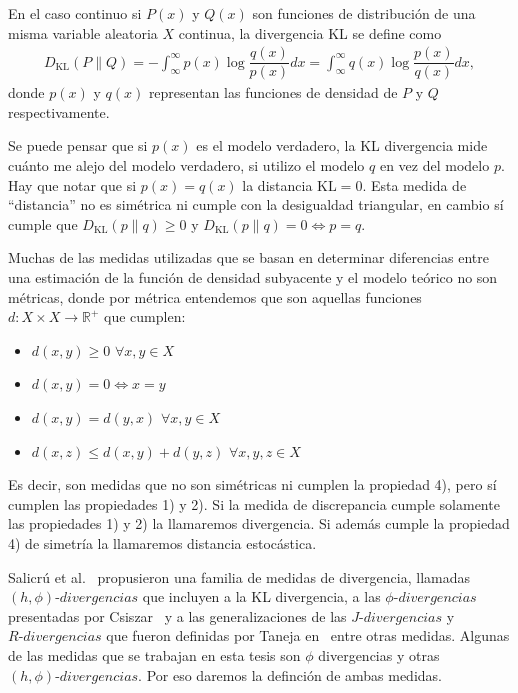 En el caso continuo si $P(x)$ y $Q(x)$ son funciones de distribuci\'on de una misma variable aleatoria $X$ continua, la divergencia KL se define como 
\begin{align}
\label{KL}
D_{\text{KL}}(P \rVert Q)=-\int_{\infty}^{\infty} p(x) \log\dfrac{q(x)}{p(x)} dx=\int_{\infty}^{\infty} q(x) \log\dfrac{p(x)}{q(x)} dx,
\end{align} 
donde $p(x)$ y $q(x)$ representan las funciones de densidad de $P$ y $Q$ respectivamente. 

Se puede pensar que si $p(x)$ es el modelo verdadero, la KL divergencia mide cu\'anto me alejo del modelo verdadero, si utilizo el modelo $q$ en vez del modelo $p$. Hay que notar que si $p(x)=q(x)$ la distancia $\text{KL}=0.$ Esta medida de ``distancia'' no es sim\'etrica ni cumple con la desigualdad triangular,  en cambio s\'i cumple que $D_{\text{KL}}(p \rVert q)\geq 0$ y $D_{\text{KL}}(p \rVert q)= 0 \Longleftrightarrow p=q.$ 

Muchas de las medidas utilizadas que se basan en determinar diferencias entre una estimación de la función de densidad subyacente y el modelo teórico no son métricas, donde por métrica entendemos que son aquellas funciones $d\colon X \times X\rightarrow \mathbb{R}^+$ que cumplen:
\begin{itemize}
	\label{metrica}
	\item $d(x,y)\geq 0$ $\forall x,y \in X$
	\item $d(x,y)= 0 \Leftrightarrow x=y$
	\item $d(x,y)=d(y,x)$  $\forall x,y \in X$
	\item $d(x,z)\leq d(x,y)+d(y,z)$  $\forall x,y,z \in X$
\end{itemize} 

Es decir, son medidas que no son simétricas ni cumplen la propiedad 4), pero sí cumplen las propiedades 1) y 2). Si la medida de discrepancia cumple solamente las propiedades 1) y 2) la llamaremos divergencia. Si además cumple la propiedad 4) de simetría la llamaremos distancia estocástica. 

Salicrú et al.~\cite{Salicru1994} propusieron una familia de medidas de divergencia, llamadas $(h,\phi) \text{-} divergencias$ que incluyen a la KL divergencia, a las $\phi \text{-} divergencias$ presentadas por Csiszar~\cite{Csiszar1967} y a las generalizaciones de las $J \text{-} divergencias$ y $R \text{-} divergencias$ que fueron definidas por Taneja en~\cite{Taneja1989} entre otras medidas. Algunas de las medidas que se trabajan en esta tesis son $\phi$ divergencias y otras  $(h,\phi) \text{-} divergencias$. Por eso daremos la definción de ambas medidas.

